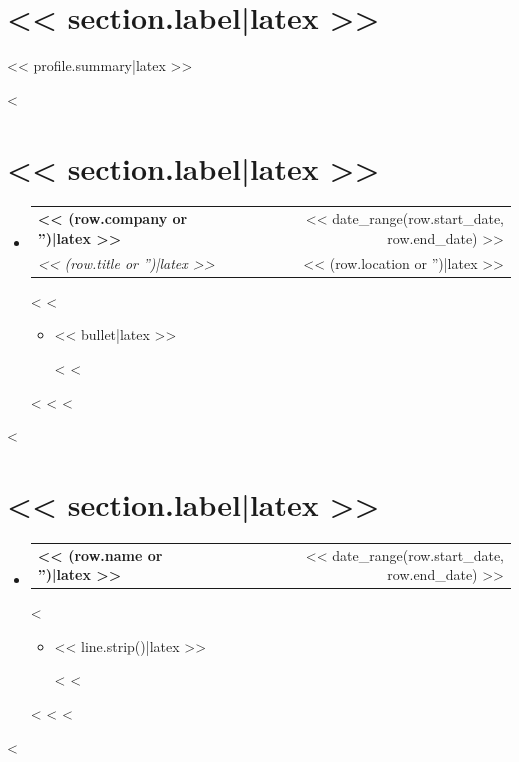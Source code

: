 \documentclass[letterpaper,11pt]{article}
\makeatletter
\newcommand{\resumeItem}[1]{
  \item\small{
    {#1 \vspace{-1pt}}
  }
}
\newcommand{\resumeSubheading}[4]{
  \vspace{-1pt}\item
    \begin{tabular*}{\textwidth}[t]{l@{\extracolsep{\fill}}r}
      \textbf{#1} & {\color{dark-grey}\small #2}\vspace{1pt}\\
      \textit{#3} & {\color{dark-grey} \small #4}\\
    \end{tabular*}\vspace{-4pt}
}
\newcommand{\resumeProjectHeading}[2]{
    \item
    \begin{tabular*}{\textwidth}{l@{\extracolsep{\fill}}r}
      #1 & {\color{dark-grey} \small #2} \\
    \end{tabular*}\vspace{-4pt}
}
\newcommand{\resumeSubHeadingListStart}{\begin{itemize}[leftmargin=0in, label={}]}
\newcommand{\resumeSubHeadingListEnd}{\end{itemize}}
\newcommand{\resumeItemListStart}{\begin{itemize}}
\newcommand{\resumeItemListEnd}{\end{itemize}\vspace{0pt}}
\makeatother
\begin{document}
\section{<< section.label|latex >>}
\begin{itemize}[leftmargin=0in, label={}]
  \small{\item{<< profile.summary|latex >>}}
\end{itemize}
<%
\section{<< section.label|latex >>}
  \resumeSubHeadingListStart
<%
<%
    \resumeSubheading
      {<< (row.company or '')|latex >>}{<< date_range(row.start_date, row.end_date) >>}
      {<< (row.title or '')|latex >>}{<< (row.location or '')|latex >>}
<%
<%
      \resumeItemListStart
<%
<%
        \resumeItem{<< bullet|latex >>}
<%
<%
      \resumeItemListEnd
<%
<%
<%
  \resumeSubHeadingListEnd
<%
\section{<< section.label|latex >>}
    \resumeSubHeadingListStart
<%
<%
      \resumeProjectHeading
          {\textbf{<< (row.name or '')|latex >>}}{<< date_range(row.start_date, row.end_date) >>}
<%
          \resumeItemListStart
<%
<%
            \resumeItem{<< line.strip()|latex >>}
<%
<%
          \resumeItemListEnd
<%
<%
<%
    \resumeSubHeadingListEnd
<%
\end{document}
